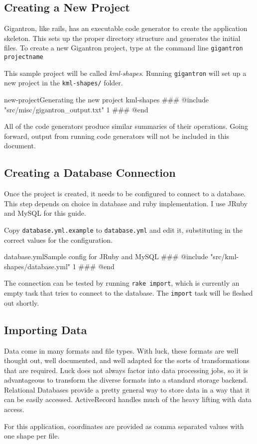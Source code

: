 \documentclass[12pt]{article}
\begin{document}
\subsection*{Creating a New Project}

Gigantron, like rails, has an executable code generator to create the application skeleton.  This sets up the proper directory structure and generates the initial files. To create a new Gigantron project, type at the command line \texttt{gigantron projectname}

This sample project will be called \textit{kml-shapes}.  Running \texttt{gigantron} will set up a new project in the \texttt{kml-shapes/} folder.

\begin{code}{new-project}{Generating the new project kml-shapes}
### @include "src/misc/gigantron_output.txt" 1
### @end
\end{code}

All of the code generators produce similar summaries of their operations.  Going forward, output from running code generators will not be included in this document.

\subsection*{Creating a Database Connection}

Once the project is created, it needs to be configured to connect to a database.  This step depends on choice in database and ruby implementation.  I use JRuby and MySQL for this guide.

Copy \texttt{database.yml.example} to \texttt{database.yml} and edit it, substituting in the correct values for the configuration.

\begin{code}{database.yml}{Sample config for JRuby and MySQL}
### @include "src/kml-shapes/database.yml" 1
### @end
\end{code}

The connection can be tested by running \texttt{rake import}, which is currently an empty task that tries to connect to the database.  The \texttt{import} task will be fleshed out shortly.

\subsection*{Importing Data}

Data come in many formats and file types. With luck, these formats are well thought out, well documented, and well adapted for the sorts of transformations that are required.  Luck does not always factor into data processing jobs, so it is advantageous to transform the diverse formats into a standard storage backend.  Relational Databases provide a pretty general way to store data in a way that it can be easily accessed.  ActiveRecord handles much of the heavy lifting with data access.

For this application, coordinates are provided as comma separated values with one shape per file.
\end{document}
